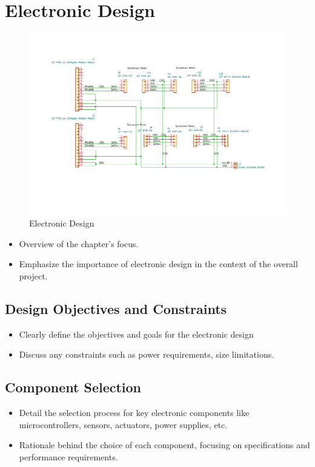 \chapter{Electronic Design}

\graphicspath{{./Figures/Electronic Design/}}

\begin{figure}[h]
	\centering
	\includegraphics[width=1\linewidth]{Legged_TWIPR_Wiring_Tree}
	\caption{Electronic Design}
	\label{fig:electronicdesign}
\end{figure}
\begin{itemize}
	\item Overview of the chapter's focus.
	\item Emphasize the importance of electronic design in the context of the overall project.
\end{itemize}


\section{Design Objectives and Constraints}
\begin{itemize}
	\item Clearly define the objectives and goals for the electronic design
	\item Discuss any constraints such as power requirements, size limitations.
\end{itemize}
\section{Component Selection}
\begin{itemize}
	\item Detail the selection process for key electronic components like microcontrollers, sensors, actuators, power supplies, etc.
	\item Rationale behind the choice of each component, focusing on specifications and performance requirements.
\end{itemize}
